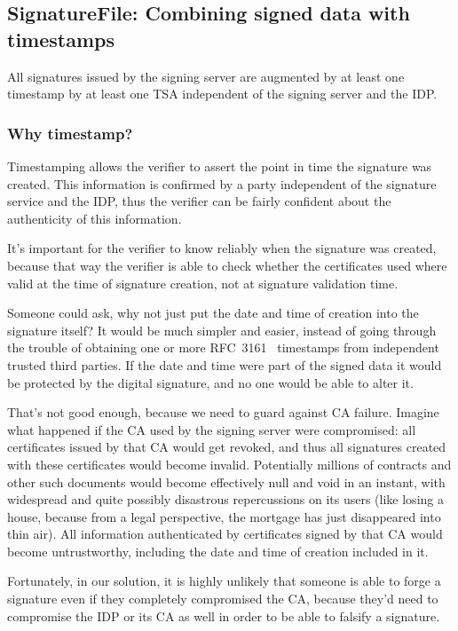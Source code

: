 \subsection{SignatureFile: Combining signed data with timestamps}\label{subsec:signaturefile:-combining-signed-data-with-timestamps}
All signatures issued by the signing server are augmented by at least one timestamp by at least one \gls{TSA} independent of the signing server and the \gls{IDP}.

\subsubsection{Why timestamp?}
Timestamping allows the verifier to assert the point in time the signature was created.
This information is confirmed by a party independent of the signature service and the \gls{IDP},
thus the verifier can be fairly confident about the authenticity of this information.

It's important for the verifier to know reliably when the signature was created,
because that way the verifier is able to check whether the certificates used where valid at the time of signature creation,
not at signature validation time.

Someone could ask, why not just put the date and time of creation into the signature itself?
It would be much simpler and easier,
instead of going through the trouble of obtaining one or more RFC~3161~\cite{rfc3161} timestamps
from independent trusted third parties.
If the date and time were part of the signed data it would be protected by the digital signature,
and no one would be able to alter it.

That's not good enough, because we need to guard against \gls{CA} failure.
Imagine what happened if the \gls{CA} used by the signing server were compromised:
all certificates issued by that \gls{CA} would get revoked,
and thus all signatures created with these certificates would become invalid.
Potentially millions of contracts and other such documents would become effectively null and void in an instant,
with widespread and quite possibly disastrous repercussions on its users
(like losing a house, because from a legal perspective, the mortgage has just disappeared into thin air).
All information authenticated by certificates signed by that \gls{CA} would become untrustworthy,
including the date and time of creation included in it.

Fortunately, in our solution, it is highly unlikely that someone is able to forge a signature even if they
completely compromised the \gls{CA}, because they'd need to compromise the \gls{IDP} or its \gls{CA} as well
in order to be able to falsify a signature.

